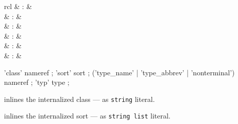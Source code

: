 \begin{isabellebody}
\begin{isamarkuptext}
\begin{description}
  \end{description}%
\end{isamarkuptext}%
\isamarkuptrue%
%
\endisatagmlref
{\isafoldmlref}%
%
\isadelimmlref
%
\endisadelimmlref
%
\isadelimmlantiq
%
\endisadelimmlantiq
%
\isatagmlantiq
%
\begin{isamarkuptext}%
\begin{matharray}{rcl}
  \hypertarget{ML antiquotation.class}{\hyperlink{ML antiquotation.class}{\mbox{}}} & : &  \\
  \hypertarget{ML antiquotation.sort}{\hyperlink{ML antiquotation.sort}{\mbox{}}} & : &  \\
  \hypertarget{ML antiquotation.type-name}{\hyperlink{ML antiquotation.type-name}{\mbox{}}} & : &  \\
  \hypertarget{ML antiquotation.type-abbrev}{\hyperlink{ML antiquotation.type-abbrev}{\mbox{}}} & : &  \\
  \hypertarget{ML antiquotation.nonterminal}{\hyperlink{ML antiquotation.nonterminal}{\mbox{}}} & : &  \\
  \hypertarget{ML antiquotation.typ}{\hyperlink{ML antiquotation.typ}{\mbox{}}} & : &  \\
  \end{matharray}

  \begin{rail}
  'class' nameref
  ;
  'sort' sort
  ;
  ('type_name' | 'type_abbrev' | 'nonterminal') nameref
  ;
  'typ' type
  ;
  \end{rail}

  \begin{description}

  \item {} inlines the internalized class  --- as \verb|string| literal.

  \item {} inlines the internalized sort 
  --- as \verb|string list| literal.


\end{description}
\end{isamarkuptext}
\end{isabellebody}
